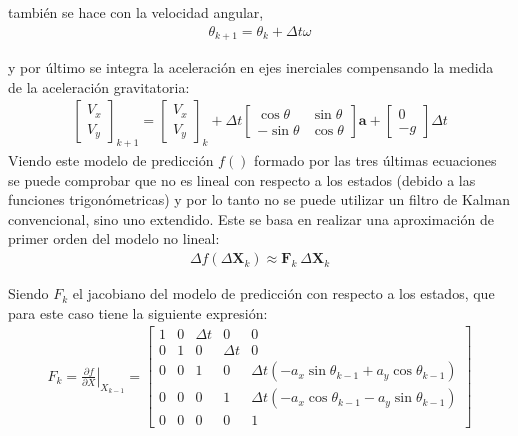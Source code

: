 también se hace con la velocidad angular,
\begin{align}
\theta_{k+1} = \theta_k + \Delta t \omega
\end{align}

y por último se integra la aceleración en ejes inerciales compensando la medida de la aceleración gravitatoria:
\begin{align}
\begin{bmatrix} 
V_x \\ V_y 
\end{bmatrix}_{k+1}
=
\begin{bmatrix} 
V_x \\ V_y 
\end{bmatrix}_k + 
\Delta t
\begin{bmatrix} 
\cos{\theta} & \sin{\theta} \\ -\sin{\theta} & \cos{\theta}
\end{bmatrix}
\bm{a} +  
\begin{bmatrix} 
0 \\ - g 
\end{bmatrix}\Delta t
\end{align}
Viendo este modelo de predicción $f()$ formado por las tres últimas ecuaciones se puede comprobar que no es lineal con respecto a los estados (debido a las funciones trigonómetricas) y por lo tanto no se puede utilizar un filtro de Kalman convencional, sino uno extendido. Este se basa en realizar una aproximación de primer orden del modelo no lineal:
\begin{align}
\Delta f(\Delta \bm{X}_k) \approx \bm{F}_k\ \Delta \bm{X}_k \end{align} 

Siendo $F_k$ el jacobiano del modelo de predicción con respecto a los estados, que para este caso tiene la siguiente expresión:
\begin{align}
F_k =\left. \frac{\partial f}{\partial X}\right| _{X_{k-1}} =  
\begin{bmatrix} 
1 	&0	&\Delta t	&0		&0\\
0 	&1	&0		&\Delta t	&0\\
0 	&0	&1		&0		&\Delta t\left(-a_x\sin{\theta_{k-1}} + a_y\cos{\theta_{k-1}}\right) \\
0 	&0	&0		&1		&\Delta t\left(-a_x\cos{\theta_{k-1}} - a_y\sin{\theta_{k-1}}\right) \\
0 	&0	&0		&0		&1
\end{bmatrix}
\end{align}




